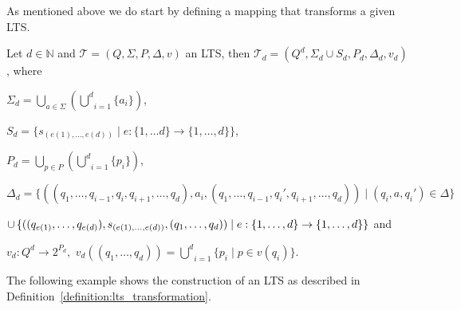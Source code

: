 As mentioned above we do start by defining a mapping that transforms a given LTS.

\begin{definition}
    \label{definition:lts_transformation}
    Let $d \in \mathbb{N}$ and $\mathcal{T} = (Q, \Sigma, P, \Delta, v)$ an LTS, then
    $\mathcal{T}_d = (Q^d, \Sigma_d \cup S_d, P_d, \Delta_d, v_d)$, where
    \begin{compactitem}
        \item $\Sigma_d = \underset{a \in \Sigma}{\bigcup}(\underset{i = 1}{\overset{d}{\bigcup}} \{a_i\})$,
        \item $S_d = \{s_{(e(1), \dots, e(d))} \mid e: \{1, \dots d\} \rightarrow \{1, \dots, d\}\}$,
        \item $P_d = \underset{p \in P}{\bigcup}(\underset{i = 1}{\overset{d}{\bigcup}} \{p_i\})$,
        \item $\Delta_d = \{((q_1, \dots ,q_{i - 1}, q_i, q_{i + 1}, \dots, q_d), a_i, (q_1, \dots ,q_{i - 1},
        {q_i}', q_{i + 1}, \dots, q_d)) \mid (q_i, a, {q_i}') \in \Delta\}$

        $\cup\,\{((q_{e(1)}, \dots, q_{e(d)}), s_{(e(1),
        \dots, e(d))}, (q_1, \dots, q_d)) \mid \\e: \{1, \dots, d\} \rightarrow \{1, \dots, d\}\}$ and
        \item $v_d \colon Q^d \rightarrow 2^{P_d}, $
        $v_d((q_1, \dots, q_d)) = \underset{i = 1}{\overset{d}{\bigcup}} \{p_i \mid p \in v(q_i)\}$.
    \end{compactitem}
\end{definition}

The following example shows the construction of an LTS as described in Definition~\ref{definition:lts_transformation}.

